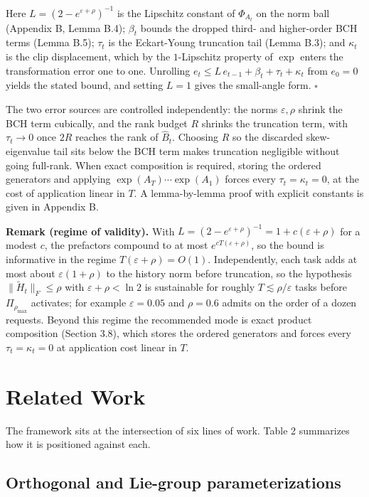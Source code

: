\documentclass[
]{article}
\begin{document}
Here \(L=(2-e^{\varepsilon+\rho})^{-1}\) is the Lipschitz constant of \(\Phi_{A_t}\) on the norm ball (Appendix B, Lemma B.4); \(\beta_t\) bounds the dropped third- and higher-order BCH terms (Lemma B.5); \(\tau_t\) is the Eckart-Young truncation tail (Lemma B.3); and \(\kappa_t\) is the clip displacement, which by the \(1\)-Lipschitz property of \(\exp\) enters the transformation error one to one. Unrolling \(e_t\leq L\,e_{t-1}+\beta_t+\tau_t+\kappa_t\) from \(e_0=0\) yields the stated bound, and setting \(L=1\) gives the small-angle form. \(\square\)

The two error sources are controlled independently: the norms \(\varepsilon,\rho\) shrink the BCH term cubically, and the rank budget \(R\) shrinks the truncation term, with \(\tau_t\to 0\) once \(2R\) reaches the rank of \(\hat{B}_t\). Choosing \(R\) so the discarded skew-eigenvalue tail sits below the BCH term makes truncation negligible without going full-rank. When exact composition is required, storing the ordered generators and applying \(\exp(A_T)\cdots\exp(A_1)\) forces every \(\tau_t=\kappa_t=0\), at the cost of application linear in \(T\). A lemma-by-lemma proof with explicit constants is given in Appendix B.

\textbf{Remark (regime of validity).} With \(L=(2-e^{\varepsilon+\rho})^{-1}=1+c(\varepsilon+\rho)\) for a modest \(c\), the prefactors compound to at most \(e^{cT(\varepsilon+\rho)}\), so the bound is informative in the regime \(T(\varepsilon+\rho)=O(1)\). Independently, each task adds at most about \(\varepsilon(1+\rho)\) to the history norm before truncation, so the hypothesis \(\|\tilde{H}_t\|_F\leq\rho\) with \(\varepsilon+\rho<\ln 2\) is sustainable for roughly \(T\lesssim\rho/\varepsilon\) tasks before \(\Pi_{\rho_{\max}}\) activates; for example \(\varepsilon=0.05\) and \(\rho=0.6\) admits on the order of a dozen requests. Beyond this regime the recommended mode is exact product composition (Section 3.8), which stores the ordered generators and forces every \(\tau_t=\kappa_t=0\) at application cost linear in \(T\).

\section{Related Work}\label{related-work}

The framework sits at the intersection of six lines of work. Table 2 summarizes how it is positioned against each.

\subsection{Orthogonal and Lie-group parameterizations}\label{orthogonal-and-lie-group-parameterizations}
\end{document}
